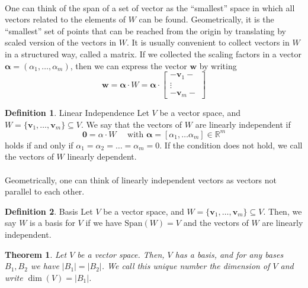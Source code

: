 \documentclass{article}
\newtheorem{theorem}{Theorem}[section]
\theoremstyle{definition}
\newtheorem{definition}{Definition}[section]
\theoremstyle{example}
\newcommand{\Reals}{\mathbb{R}}
\newcommand{\Span}{\text{Span}}
\renewcommand{\vec}[1]{\mathbf{#1}}
\begin{document}
\paragraph{} One can think of the span of a set of vector as the ``smallest''
space in which all vectors related to the elements of $W$ can be found.
Geometrically, it is the ``smallest'' set of points that can be reached from the
origin by translating by scaled version of the vectors in $W$. It is usually
convenient to collect vectors in $W$ in a structured way, called a matrix. If we
collected the scaling factors in a vector $\vec{\alpha} = (\alpha_1, \hdots,
\alpha_m)$, then we can express the vector $\vec{w}$ by writing
\[
  \vec{w} = \vec{\alpha} \cdot W = \vec{\alpha} \cdot 
  \begin{bmatrix}
    - \vec{v}_1 - \\
    \vdots \\
    - \vec{v}_m - 
  \end{bmatrix}
\]
\begin{definition}{Linear Independence}
  Let $V$ be a vector space, and $W = \{\vec{v}_1, \hdots, \vec{v}_m\} \subseteq
  V$. We say that the vectors of $W$ are linearly independent if
  \[
    \vec{0} = \alpha \cdot W\quad\text{ with }
    \vec{\alpha} = [\alpha_1, \hdots \alpha_m] \in \Reals^m 
 \]
  holds if and only if $\alpha_1 = \alpha_2 = \hdots = \alpha_m = 0$. If the
  condition does not hold, we call the vectors of $W$ linearly dependent.
\end{definition}
\paragraph{} Geometrically, one can think of linearly independent vectors as
vectors not parallel to each other.
\begin{definition}{Basis}
  Let $V$ be a vector space, and $W = \{\vec{v}_1, \hdots, \vec{v}_m\} \subseteq
  V$. Then, we say $W$ is a basis for $V$ if we have $\Span(W) = V$ and the
  vectors of $W$ are linearly independent.
\end{definition}
\begin{theorem}
  Let $V$ be a vector space. Then, $V$ has a basis, and for any bases $B_1, B_2$
  we have $|B_1| = |B_2|$. We call this unique number the dimension of $V$ and
  write $\dim(V) = |B_1|$.
\end{theorem}
\end{document}

